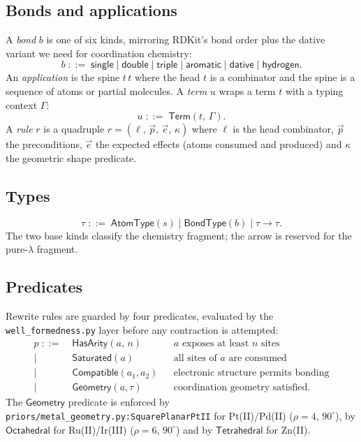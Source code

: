 \subsection{Bonds and applications}
A \emph{bond} $b$ is one of six kinds, mirroring RDKit's bond order plus the
dative variant we need for coordination chemistry:
\[
  b \;::=\; \mathsf{single} \mid \mathsf{double} \mid \mathsf{triple}
          \mid \mathsf{aromatic} \mid \mathsf{dative} \mid \mathsf{hydrogen}.
\]
An \emph{application} is the spine $t \, t$ where the head $t$ is a
combinator and the spine is a sequence of atoms or partial molecules.
A \emph{term} $u$ wraps a term $t$ with a typing context $\Gamma$:
\[
  u \;::=\; \mathsf{Term}(t,\,\Gamma).
\]
A \emph{rule} $r$ is a quadruple
$r = (\ell,\,\vec p,\,\vec e,\,\kappa)$ where $\ell$ is the head combinator,
$\vec p$ the preconditions, $\vec e$ the expected effects (atoms consumed and
produced) and $\kappa$ the geometric shape predicate.

\subsection{Types}
\[
  \tau \;::=\; \mathsf{AtomType}(s) \mid \mathsf{BondType}(b)
            \mid \tau \to \tau.
\]
The two base kinds classify the chemistry fragment; the arrow is reserved
for the pure-$\lambda$ fragment.

\subsection{Predicates}
Rewrite rules are guarded by four predicates, evaluated by the
\texttt{well\_formedness.py} layer before any contraction is attempted:
\begin{align*}
  p \;::=\;& \mathsf{HasArity}(a,\,n)        && a \text{ exposes at least } n \text{ sites} \\
           \mid\;& \mathsf{Saturated}(a)        && \text{all sites of } a \text{ are consumed} \\
           \mid\;& \mathsf{Compatible}(a_1,a_2) && \text{electronic structure permits bonding} \\
           \mid\;& \mathsf{Geometry}(a,\tau)    && \text{coordination geometry satisfied.}
\end{align*}
The $\mathsf{Geometry}$ predicate is enforced by
\texttt{priors/metal\_geometry.py:SquarePlanarPtII} for Pt(II)/Pd(II)
($\rho = 4$, $90^\circ$), by $\mathsf{Octahedral}$ for Ru(II)/Ir(III)
($\rho = 6$, $90^\circ$) and by $\mathsf{Tetrahedral}$ for Zn(II).

